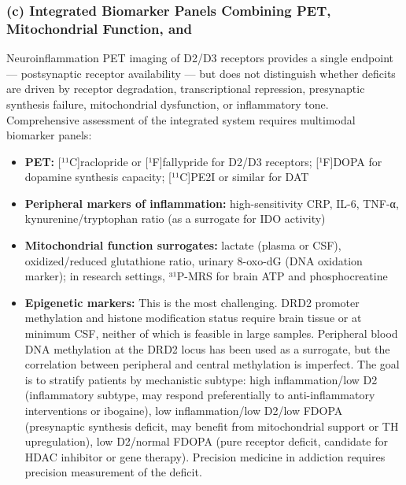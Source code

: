 \subsubsection{(c) Integrated Biomarker Panels Combining PET, Mitochondrial Function, and}\label{18_restoration-c-integrated-biomarker-panels-combining-pet-mitochondrial-function-and}

Neuroinflammation PET imaging of D2/D3 receptors provides a single endpoint --- postsynaptic receptor availability --- but does not distinguish whether deficits are driven by receptor degradation, transcriptional repression, presynaptic synthesis failure, mitochondrial dysfunction, or inflammatory tone. Comprehensive assessment of the integrated system requires multimodal biomarker panels:

\begin{itemize}
\tightlist
\item
  \textbf{PET:} {[}¹¹C{]}raclopride or {[}¹F{]}fallypride for D2/D3 receptors; {[}¹F{]}DOPA for dopamine synthesis capacity; {[}¹¹C{]}PE2I or similar for DAT\\
\item
  \textbf{Peripheral markers of inflammation:} high-sensitivity CRP, IL-6, TNF-α, kynurenine/tryptophan ratio (as a surrogate for IDO activity)\\
\item
  \textbf{Mitochondrial function surrogates:} lactate (plasma or CSF), oxidized/reduced glutathione ratio, urinary 8-oxo-dG (DNA oxidation marker); in research settings, ³¹P-MRS for brain ATP and phosphocreatine\\
\item
  \textbf{Epigenetic markers:} This is the most challenging. DRD2 promoter methylation and histone modification status require brain tissue or at minimum CSF, neither of which is feasible in large samples. Peripheral blood DNA methylation at the DRD2 locus has been used as a surrogate, but the correlation between peripheral and central methylation is imperfect. The goal is to stratify patients by mechanistic subtype: high inflammation/low D2 (inflammatory subtype, may respond preferentially to anti-inflammatory interventions or ibogaine), low inflammation/low D2/low FDOPA (presynaptic synthesis deficit, may benefit from mitochondrial support or TH upregulation), low D2/normal FDOPA (pure receptor deficit, candidate for HDAC inhibitor or gene therapy). Precision medicine in addiction requires precision measurement of the deficit.
\end{itemize}


